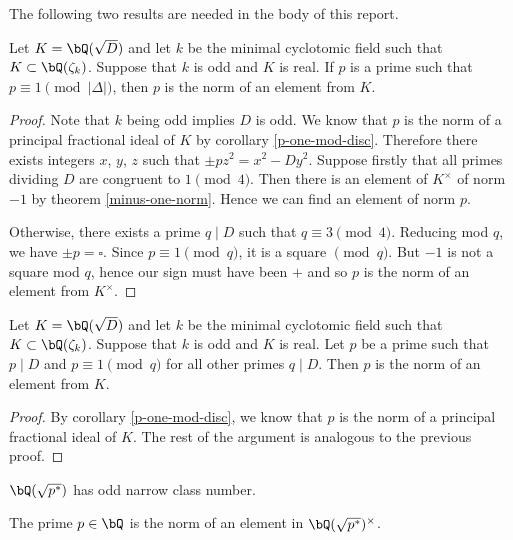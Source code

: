 The following two results are needed in the body of this report.

\begin{thm}\label{p-norm-elem-1}
    Let $K = \bQ(\sqrt{D})$ and let $k$ be the minimal cyclotomic field such that $K \subset \bQ(\zeta_k)$. Suppose that $k$ is odd and $K$ is real.  If $p$ is a prime such that $p \equiv 1 \pmod {|\Delta|}$, then $p$ is the norm of an element from $K$. 
\end{thm}

\begin{proof}
    Note that $k$ being odd implies $D$ is odd. We know that $p$ is the norm of a principal fractional ideal of $K$ by corollary \ref{p-one-mod-disc}. Therefore there exists integers $x$, $y$, $z$ such that $\pm p z^2 = x^2 - Dy^2$. Suppose firstly that all primes dividing $D$ are congruent to $1 \pmod 4$. Then there is an element of $K^{\times}$ of norm $-1$ by theorem \ref{minus-one-norm}. Hence we can find an element of norm $p$.

    Otherwise, there exists a prime $q \mid D$ such that $q \equiv 3 \pmod 4$. Reducing mod $q$, we have
    $ \pm p = \square$. Since $p \equiv 1 \pmod q$, it is a square $\pmod q$. But $-1$ is not a square mod $q$, hence our sign must have been $+$ and so $p$ is the norm of an element from $K^{\times}$.
\end{proof}

\begin{thm}\label{p-norm-elem-2}
    Let $K = \bQ(\sqrt{D})$ and let $k$ be the minimal cyclotomic field such that $K \subset \bQ(\zeta_k)$. Suppose that $k$ is odd and $K$ is real. Let $p$ be a prime such that $p \mid D$ and $p \equiv 1 \pmod q$ for all other primes $q \mid D$. Then $p$ is the norm of an element from $K$. 
\end{thm}

\begin{proof}
    By corollary \ref{p-one-mod-disc}, we know that $p$ is the norm of a principal fractional ideal of $K$. The rest of the argument is analogous to the previous proof.
\end{proof}


\begin{prop}
$\bQ(\sqrt{p^*})$ has odd narrow class number.
\end{prop}    

\begin{cor}\label{p-norm}
The prime $p \in \bQ$ is the norm of an element in $\bQ(\sqrt{p^*})^{\times}$.
\end{cor}
